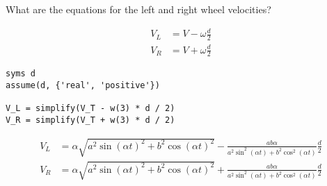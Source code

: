 What are the equations for the left and right wheel velocities?

\begin{solution}
\begin{align*}
    V_L &= V - \omega\frac{d}{2} \\
    V_R &= V + \omega\frac{d}{2}
\end{align*}

\begin{lstlisting}
syms d
assume(d, {'real', 'positive'})

V_L = simplify(V_T - w(3) * d / 2)
V_R = simplify(V_T + w(3) * d / 2)
\end{lstlisting}

\begin{align*}
    V_L &= \alpha \sqrt{a^{2} \sin (\alpha t)^{2}+b^{2} \cos (\alpha t)^{2}}-\frac{a b \alpha}{a^{2} \sin ^{2}(\alpha t)+b^{2} \cos ^{2}(\alpha t)} \frac{d}{2} \\
    V_R &= \alpha \sqrt{a^{2} \sin (\alpha t)^{2}+b^{2} \cos (\alpha t)^{2}}+\frac{a b \alpha}{a^{2} \sin ^{2}(\alpha t)+b^{2} \cos ^{2}(\alpha t)} \frac{d}{2}
\end{align*}
\end{solution}